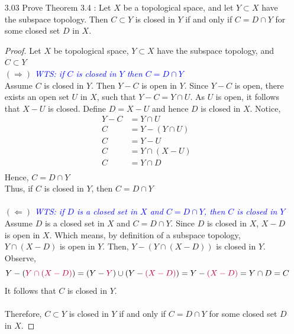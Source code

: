 \documentclass[12pt]{article}
\newcommand{\wts}[1]{\textit{\textcolor{blue}{WTS: #1}}\\}
\begin{document}
\begin{enumerate}
		\item[3.03] Prove Theorem 3.4 : Let $X$ be a topological space, and let $Y \subset X$ have the subspace topology. Then $C \subset Y$ is closed in $Y$ if and only if $C=D \cap Y$ for some closed set $D$ in $X$.\\
		\begin{proof}
			Let $ X $ be topological space, $ Y\subset X $ have the subspace topology, and $ C\subset Y $ \\
		$(\Rightarrow)$ \wts{if $ C $ is closed in $ Y $ then $ C=D\cap Y $}
		Assume $ C $ is closed in $ Y $. Then $ Y-C $ is open in $ Y $. Since $ Y-C $ is open, there exists an open set $ U $ in $ X $, such that $ Y-C=Y\cap U $. As $ U $ is open, it follows that $ X-U $ is closed. Define $ D=X-U $ and hence $ D $ is closed in $ X $. Notice,
			\begin{align*}
				Y-C &= Y\cap U\\
				C &= Y- (Y\cap U)\\
				C &= Y-U\\
				C &= Y\cap(X-U)\\
				C &= Y\cap D\\
			\end{align*}
		Hence, $ C=D\cap Y $\\
		Thus, if $ C $ is closed in $ Y $, then $ C=D\cap Y $\\
		\\
		$(\Leftarrow)$ \wts{if $ D $ is a closed set in $ X $ and $ C=D\cap Y $, then $ C $ is closed in $ Y $}
		Assume $ D $ is a closed set in $ X $ and $ C=D\cap Y $. Since $ D $ is closed in $ X $, $ X-D $ is open in $ X $. Which means, by definition of a subspace topology, $ Y\cap(X-D) $ is open in $ Y $. Then, $ Y-(Y\cap(X-D)) $ is closed in $ Y $. Observe,
			\[Y-(\textcolor{purple}{Y\cap(X-D)})=(Y-\textcolor{purple}{Y})\cup (Y-\textcolor{purple}{(X-D)})=Y-\textcolor{purple}{(X-D)}=Y\cap D = C\]
		It follows that $ C $ is closed in $ Y $.\\
		\\
		Therefore, $C \subset Y$ is closed in $Y$ if and only if $C=D \cap Y$ for some closed set $D$ in $X$.
		\end{proof}
		

\end{enumerate}
\end{document}
